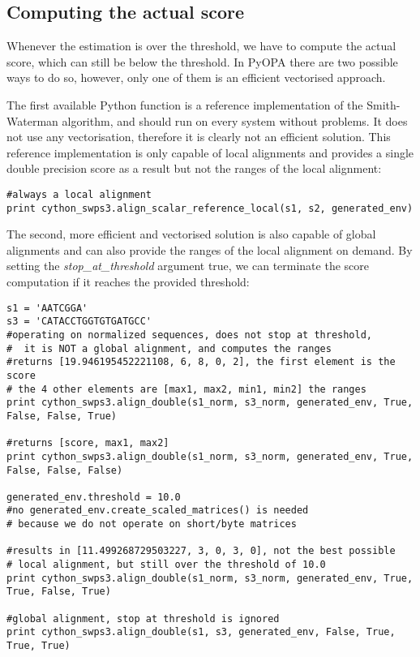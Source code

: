 \documentclass[12pt]{article}
\newcommand{\pp}{PyOPA}
\begin{document}
\subsection{Computing the actual score}
\label{subsec:compAct}

Whenever the estimation is over the threshold, we have to compute the actual score, which can still be below the threshold. In \pp{} there are two possible ways to do so, however, only one of them is an efficient vectorised approach.

The first available Python function is a reference implementation of the Smith-Waterman algorithm, and should run on every system without problems. It does not use any vectorisation, therefore it is clearly not an efficient solution. This reference implementation is only capable of local alignments and provides a single double precision score as a result but not the ranges of the local alignment:

\begin{lstlisting}
#always a local alignment
print cython_swps3.align_scalar_reference_local(s1, s2, generated_env)
\end{lstlisting}

The second, more efficient and vectorised solution is also capable of global alignments and can also provide the ranges of the local alignment on demand. By setting the \emph{stop\_at\_threshold} argument true, we can terminate the score computation if it reaches the provided threshold:

\begin{lstlisting}
s1 = 'AATCGGA'
s3 = 'CATACCTGGTGTGATGCC'
#operating on normalized sequences, does not stop at threshold,
#  it is NOT a global alignment, and computes the ranges
#returns [19.946195452221108, 6, 8, 0, 2], the first element is the score
# the 4 other elements are [max1, max2, min1, min2] the ranges
print cython_swps3.align_double(s1_norm, s3_norm, generated_env, True, False, False, True)

#returns [score, max1, max2]
print cython_swps3.align_double(s1_norm, s3_norm, generated_env, True, False, False, False)

generated_env.threshold = 10.0
#no generated_env.create_scaled_matrices() is needed
# because we do not operate on short/byte matrices

#results in [11.499268729503227, 3, 0, 3, 0], not the best possible
# local alignment, but still over the threshold of 10.0
print cython_swps3.align_double(s1_norm, s3_norm, generated_env, True, True, False, True)

#global alignment, stop at threshold is ignored
print cython_swps3.align_double(s1, s3, generated_env, False, True, True, True)
\end{lstlisting}
\end{document}
